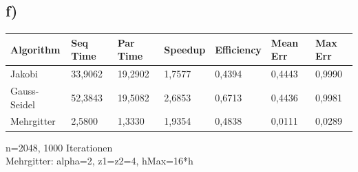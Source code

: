 \documentclass[paper = a4]{scrartcl}
\begin{document}
\subsection*{f)}
\begin{tabular}{l|l|l|l|l|l|l}
\hline
Algorithm    & Seq Time & Par Time & Speedup & Efficiency & Mean Err & Max Err \\
\hline
Jakobi       & 33,9062  & 19,2902  & 1,7577  & 0,4394     & 0,4443   & 0,9990 \\
Gauss-Seidel & 52,3843  & 19,5082  & 2,6853  & 0,6713     & 0,4436   & 0,9981 \\
Mehrgitter   & 2,5800   & 1,3330   & 1,9354  & 0,4838     & 0,0111   & 0,0289 \\
\hline
\end{tabular}
n=2048, 1000 Iterationen\\
Mehrgitter: alpha=2, z1=z2=4, hMax=16*h
\end{document}

